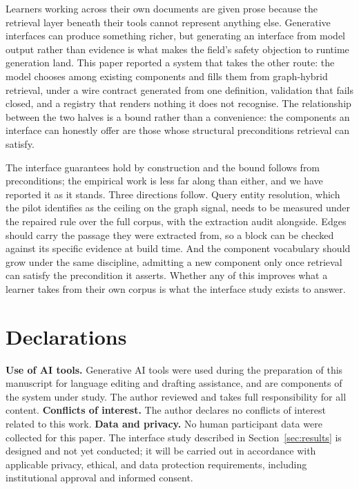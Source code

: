 \documentclass[conference]{IEEEtran}
\begin{document}
Learners working across their own documents are given prose because the retrieval layer beneath their tools cannot represent anything else. Generative interfaces can produce something richer, but generating an interface from model output rather than evidence is what makes the field's safety objection to runtime generation land. This paper reported a system that takes the other route: the model chooses among existing components and fills them from graph-hybrid retrieval, under a wire contract generated from one definition, validation that fails closed, and a registry that renders nothing it does not recognise. The relationship between the two halves is a bound rather than a convenience: the components an interface can honestly offer are those whose structural preconditions retrieval can satisfy.

The interface guarantees hold by construction and the bound follows from preconditions; the empirical work is less far along than either, and we have reported it as it stands. Three directions follow. Query entity resolution, which the pilot identifies as the ceiling on the graph signal, needs to be measured under the repaired rule over the full corpus, with the extraction audit alongside. Edges should carry the passage they were extracted from, so a block can be checked against its specific evidence at build time. And the component vocabulary should grow under the same discipline, admitting a new component only once retrieval can satisfy the precondition it asserts. Whether any of this improves what a learner takes from their own corpus is what the interface study exists to answer.
\section*{Declarations}
\textbf{Use of AI tools.} Generative AI tools were used during the preparation of this manuscript for language editing and drafting assistance, and are components of the system under study. The author reviewed and takes full responsibility for all content. \textbf{Conflicts of interest.} The author declares no conflicts of interest related to this work. \textbf{Data and privacy.} No human participant data were collected for this paper. The interface study described in Section~\ref{sec:results} is designed and not yet conducted; it will be carried out in accordance with applicable privacy, ethical, and data protection requirements, including institutional approval and informed consent.
\end{document}

